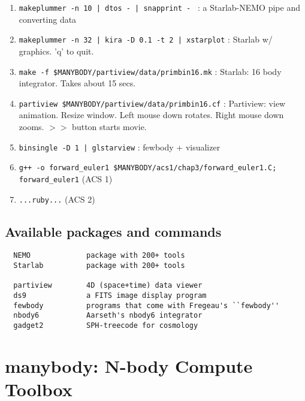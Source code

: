 {\begin{enumerate}
\item
{\tt makeplummer -n 10 | dtos - | snapprint - } : a Starlab-NEMO pipe and converting data

\item
{\tt makeplummer -n 32 | kira -D 0.1 -t 2 | xstarplot} : Starlab w/ graphics. 'q' to quit.

\item
{\tt make -f \$MANYBODY/partiview/data/primbin16.mk} : Starlab: 16 body integrator. Takes about 15 secs.

\item
{\tt partiview  \$MANYBODY/partiview/data/primbin16.cf} : Partiview: view animation. Resize window.
Left mouse down rotates. Right mouse down zooms. $>>$ button starts movie.

\item
{\tt binsingle -D 1 | glstarview} : fewbody + visualizer

\item
{\tt g++ -o forward\_euler1 \$MANYBODY/acs1/chap3/forward\_euler1.C; forward\_euler1} 
(ACS 1)

\item
{\tt ...ruby...}
(ACS 2)


\end{enumerate}

\section{Available packages and commands}

\begin{verbatim}
  NEMO             package with 200+ tools
  Starlab          package with 200+ tools

  partiview        4D (space+time) data viewer
  ds9              a FITS image display program
  fewbody          programs that come with Fregeau's ``fewbody''
  nbody6           Aarseth's nbody6 integrator
  gadget2          SPH-treecode for cosmology
\end{verbatim}


\chapter                {manybody: N-body Compute Toolbox}



}
